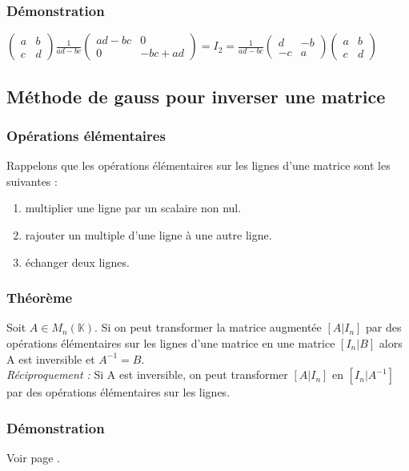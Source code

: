 \documentclass[a4paper,10pt]{book} %
\newcommand{\K}{\mathbb{K}}
\begin{document}
\subsubsection{Démonstration}

$\begin{pmatrix}
a & b\\ c & d
\end{pmatrix}\frac{1}{ad-bc} \begin{pmatrix}
ad-bc & 0 \\ 0 & -bc+ad
\end{pmatrix}=I_{2}=\frac{1}{ad-bc}\begin{pmatrix}
d & -b \\ -c & a
\end{pmatrix}\begin{pmatrix}
a & b \\ c & d
\end{pmatrix}$

\subsection{Méthode de gauss pour inverser une matrice}
\subsubsection{Opérations élémentaires}
Rappelons que les opérations élémentaires sur les lignes d'une matrice sont les suivantes :\begin{enumerate}
\item multiplier une ligne par un scalaire non nul.
\item rajouter un multiple d'une ligne à une autre ligne.
\item échanger deux lignes.
\end{enumerate}

\subsubsection{Théorème}
Soit $A\in M_{n}(\K)$. Si on peut transformer la matrice augmentée $[A|I_{n}]$ par des opérations élémentaires sur les lignes d'une matrice en une matrice $[I_{n}|B]$ alors A est inversible et $A^{-1}=B$.\\

\emph{Réciproquement :} Si A est inversible, on peut transformer $[A|I_{n}]$ en $[I_{n}|A^{-1}]$ par des opérations élémentaires sur les lignes.

\subsubsection{Démonstration}
Voir page \pageref{InverseMatrice}.
\end{document}
